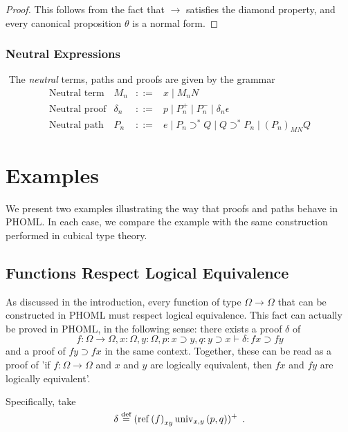 \documentclass[a4paper,UKenglish]{lipics-v2016}
\newcommand*{\eqdef}{\mathrel{\smash{\stackrel{\text{def}}{=}}}}
\newcommand*{\reff}[1]{\ensuremath{\mathrm{ref} \left( {#1} \right)}}
\newcommand*{\univ}[4]{\ensuremath{\mathrm{univ}_{{#1}, {#2}} \left({#3} , {#4} \right)}}
\theoremstyle{plain}
\theoremstyle{definition}
\begin{document}
\begin{proof}
This follows from the fact that $\rightarrow$ satisfies the diamond property, and every canonical proposition $\theta$ is a normal form.
\end{proof}

\subsubsection{Neutral Expressions}

\begin{definition}[Neutral]$ $
The \emph{neutral} terms, paths and proofs are given by the grammar
$$ \begin{array}{lrcl}
\text{Neutral term} & M_n & ::= & x \mid M_n N \\
\text{Neutral proof} & \delta_n & ::= & p \mid P_n^+ \mid P_n^- \mid \delta_n \epsilon \\
\text{Neutral path} & P_n & ::= & e \mid P_n \supset^* Q \mid Q \supset^* P_n \mid (P_n)_{MN} Q
\end{array} $$
\end{definition}

\section{Examples}

We present two examples illustrating the way that proofs and paths behave in PHOML.  In each case, we compare the example with the same construction performed in cubical type theory.

\subsection{Functions Respect Logical Equivalence}
\label{section:exampletwo}

As discussed in the introduction, every function of type $\Omega \rightarrow \Omega$ that can be constructed in PHOML must respect logical equivalence.  This fact can actually be proved in PHOML,
in the following sense: there exists a proof $\delta$ of
$$ f : \Omega \rightarrow \Omega, x : \Omega, y : \Omega, p : x \supset y, q : y \supset x \vdash \delta : f x \supset f y $$
and a proof of $f y \supset f x$ in the same context.  Together, these can be read as a proof of 'if $f : \Omega \rightarrow \Omega$ and $x$ and $y$ are logically equivalent, then $fx$ and $fy$ are logically equivalent'.

Specifically, take
$$ \delta \eqdef (\reff{f}_{xy} \univ{x}{y}{p}{q})^+ \enspace . $$
\end{document}
